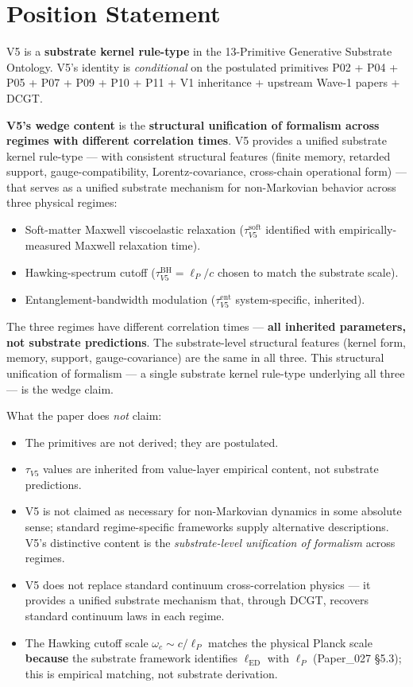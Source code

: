 \documentclass[11pt,a4paper]{article}
\begin{document}
\section{Position Statement}

V5 is a \textbf{substrate kernel rule-type} in the 13-Primitive Generative Substrate Ontology. V5's identity is \emph{conditional} on the postulated primitives P02 + P04 + P05 + P07 + P09 + P10 + P11 + V1 inheritance + upstream Wave-1 papers + DCGT.

\textbf{V5's wedge content} is the \textbf{structural unification of formalism across regimes with different correlation times}. V5 provides a unified substrate kernel rule-type --- with consistent structural features (finite memory, retarded support, gauge-compatibility, Lorentz-covariance, cross-chain operational form) --- that serves as a unified substrate mechanism for non-Markovian behavior across three physical regimes:

\begin{itemize}[noitemsep]
\item Soft-matter Maxwell viscoelastic relaxation ($\tau_{V5}^\mathrm{soft}$ identified with empirically-measured Maxwell relaxation time).
\item Hawking-spectrum cutoff ($\tau_{V5}^\mathrm{BH} = \ell_P/c$ chosen to match the substrate scale).
\item Entanglement-bandwidth modulation ($\tau_{V5}^\mathrm{ent}$ system-specific, inherited).
\end{itemize}

The three regimes have different correlation times --- \textbf{all inherited parameters, not substrate predictions}. The substrate-level structural features (kernel form, memory, support, gauge-covariance) are the same in all three. This structural unification of formalism --- a single substrate kernel rule-type underlying all three --- is the wedge claim.

What the paper does \emph{not} claim:

\begin{itemize}[noitemsep]
\item The primitives are not derived; they are postulated.
\item $\tau_{V5}$ values are inherited from value-layer empirical content, not substrate predictions.
\item V5 is not claimed as necessary for non-Markovian dynamics in some absolute sense; standard regime-specific frameworks supply alternative descriptions. V5's distinctive content is the \emph{substrate-level unification of formalism} across regimes.
\item V5 does not replace standard continuum cross-correlation physics --- it provides a unified substrate mechanism that, through DCGT, recovers standard continuum laws in each regime.
\item The Hawking cutoff scale $\omega_c \sim c/\ell_P$ matches the physical Planck scale \textbf{because} the substrate framework identifies $\ell_\mathrm{ED}$ with $\ell_P$ (Paper\_027 \S5.3); this is empirical matching, not substrate derivation.
\end{itemize}
\end{document}
